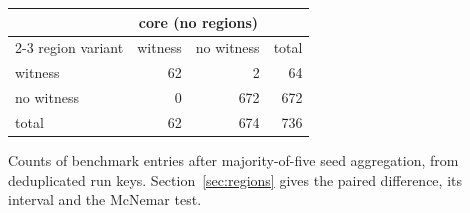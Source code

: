\begin{table}[htbp]
{\small\begin{tabular}{lrrr}
\toprule
 & \multicolumn{2}{c}{core (no regions)} & \\
\cmidrule(lr){2-3}
region variant & witness & no witness & total \\
\midrule
witness & 62 & 2 & 64 \\
no witness & 0 & 672 & 672 \\
\midrule
total & 62 & 674 & 736 \\
\bottomrule
\end{tabular}}
{Counts of benchmark entries after majority-of-five seed aggregation, from deduplicated run keys. Section~\ref{sec:regions} gives the paired difference, its interval and the McNemar test.}
\end{table}
